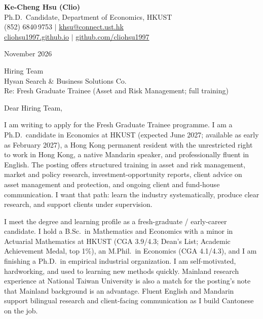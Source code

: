 \documentclass[11pt,letterpaper]{article}
\begin{document}
\noindent
{\bfseries Ke-Cheng Hsu (Clio)}\\
Ph.D.\ Candidate, Department of Economics, HKUST\\
(852) 6840\,9753 \quad $|$ \quad \href{mailto:khsu@connect.ust.hk}{khsu@connect.ust.hk}\\
\href{https://cliohsu1997.github.io/}{cliohsu1997.github.io} \quad $|$ \quad \href{https://github.com/cliohsu1997}{github.com/cliohsu1997}

\vspace{0.3em}
 November 2026

\vspace{0.2em}
\noindent
Hiring Team\\
Hysan Search \& Business Solutions Co.\\
Re: Fresh Graduate Trainee (Asset and Risk Management; full training)

\vspace{0.1em}
Dear Hiring Team,

I am writing to apply for the Fresh Graduate Trainee programme. I am a Ph.D.\ candidate in Economics at HKUST (expected June 2027; available as early as February 2027), a Hong Kong permanent resident with the unrestricted right to work in Hong Kong, a native Mandarin speaker, and professionally fluent in English. The posting offers structured training in asset and risk management, market and policy research, investment-opportunity reports, client advice on asset management and protection, and ongoing client and fund-house communication. I want that path: learn the industry systematically, produce clear research, and support clients under supervision.

I meet the degree and learning profile as a fresh-graduate / early-career candidate. I hold a B.Sc.\ in Mathematics and Economics with a minor in Actuarial Mathematics at HKUST (CGA 3.9/4.3; Dean's List; Academic Achievement Medal, top 1\%), an M.Phil.\ in Economics (CGA 4.1/4.3), and I am finishing a Ph.D.\ in empirical industrial organization. I am self-motivated, hardworking, and used to learning new methods quickly. Mainland research experience at National Taiwan University is also a match for the posting's note that Mainland background is an advantage. Fluent English and Mandarin support bilingual research and client-facing communication as I build Cantonese on the job.
\end{document}
